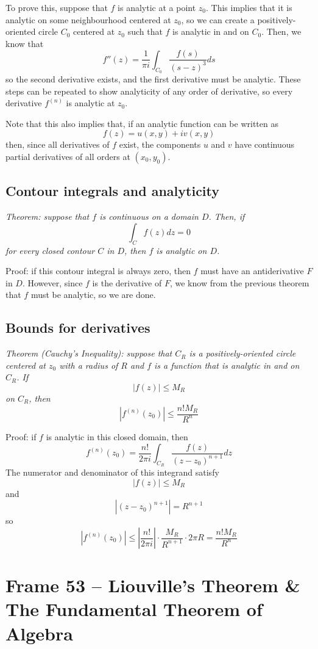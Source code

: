 \documentclass{article}
\begin{document}
To prove this, suppose that $f$ is analytic at a point $z_0$. This implies that it is analytic on some neighbourhood centered at $z_0$, so we can create a positively-oriented circle $C_0$ centered at $z_0$ such that $f$ is analytic in and on $C_0$. Then, we know that
\[
	f''(z) = \frac{1}{\pi i} \int_{C_0} \frac{f(s)}{(s - z)^3} ds
\]
so the second derivative exists, and the first derivative must be analytic. These steps can be repeated to show analyticity of any order of derivative, so every derivative $f^{(n)}$ is analytic at $z_0$.

Note that this also implies that, if an analytic function can be written as
\[
	f(z) = u(x, y) + iv(x, y)
\]
then, since all derivatives of $f$ exist, the components $u$ and $v$ have continuous partial derivatives of all orders at $(x_0, y_0)$.

\subsection{Contour integrals and analyticity} 
\textit{Theorem: suppose that $f$ is continuous on a domain $D$. Then, if
\[
	\int_C f(z) dz = 0
\]
for every closed contour $C$ in $D$, then $f$ is analytic on $D$.}

Proof: if this contour integral is always zero, then $f$ must have an antiderivative $F$ in $D$. However, since $f$ is the derivative of $F$, we know from the previous theorem that $f$ must be analytic, so we are done.

\subsection{Bounds for derivatives}
\textit{Theorem (Cauchy's Inequality): suppose that $C_R$ is a positively-oriented circle centered at $z_0$ with a radius of $R$ and $f$ is a function that is analytic in and on $C_R$. If
\[
	|f(z)| \le M_R
\]
on $C_R$, then
\[
	|f^{(n)}(z_0)| \le \frac{n! M_R}{R^n}
\]}

Proof: if $f$ is analytic in this closed domain, then
\[
	f^{(n)}(z_0) = \frac{n!}{2\pi i} \int_{C_R} \frac{f(z)}{(z - z_0)^{n+1}} dz
\]
The numerator and denominator of this integrand satisfy
\[
	|f(z)| \le M_R
\]
and
\[
	|(z - z_0)^{n+1}| = R^{n+1}
\]
so
\[
	|f^{(n)}(z_0)| 
	\le \left|\frac{n!}{2\pi i}\right| \cdot \frac{M_R}{R^{n+1}} \cdot 2\pi R
	= \frac{n! M_R}{R^n}
\]


\clearpage
\section{Frame 53 -- Liouville's Theorem \& The Fundamental Theorem of Algebra}
\end{document}
